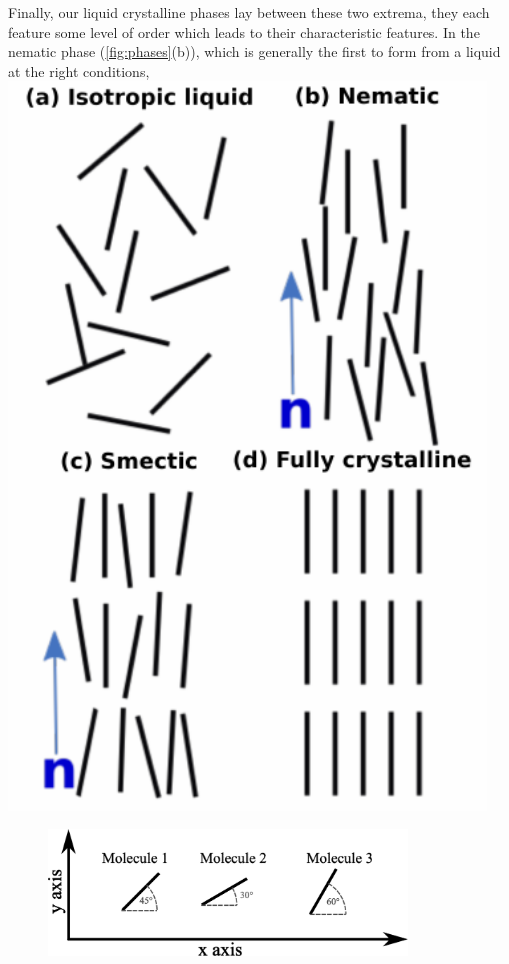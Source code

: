 \documentclass[a4paper,11pt]{article}
\newenvironment{Figure}
  {\medskip\noindent\minipage{\linewidth}}
  {\endminipage\medskip}
\begin{document}
\begin{multicols}{2}
    Finally, our liquid crystalline phases lay between these two extrema, they each feature some level of order which leads to their characteristic features.
    In the nematic phase (\cref{fig:phases}(b)), which is generally the first to form from a liquid at the right conditions,
    \begin{Figure}
        \centering
        \includegraphics[width=0.95\textwidth]{figures/phases.pdf}
        \label{fig:phases}
    \end{Figure}
    \begin{figure}[th]
        \centering
        \includegraphics[width=0.85\textwidth]{figures/mols.pdf}

\end{figure}
\end{multicols}
\end{document}
